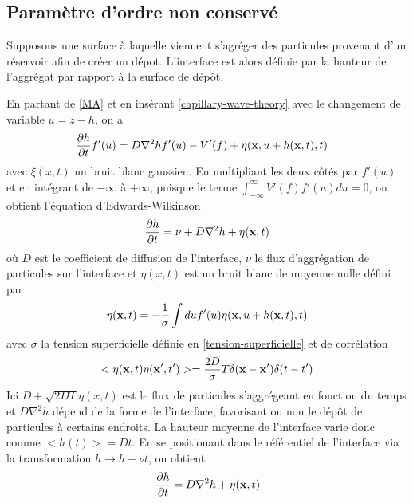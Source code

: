     \subsection{Paramètre d'ordre non conservé}

Supposons une surface à laquelle viennent s'agréger des particules provenant d'un réservoir afin de créer un dépot. L'interface est alors définie par la hauteur de l'aggrégat par rapport à la surface de dépôt.

En partant de \ref{MA} et en insérant \ref{capillary-wave-theory} avec le changement de variable $u= z-h$, on a \cite{bray_interface_2001}
\begin{align}
    \frac{\partial h}{\partial t} f'(u) &= D \nabla^2 h f'(u) - V'(f) + \eta({\bf x},u+h({\bf x},t),t)
\end{align}
avec $\xi(x,t)$ un bruit blanc gaussien. En multipliant les deux côtés par $f'(u)$ et en intégrant de $-\infty$ à $+\infty$, puisque le terme $ \int_{-\infty}^\infty V'(f) f'(u) du = 0$, on obtient l'équation d'Edwards-Wilkinson \cite{edwards_surface_1982} 
\begin{align}
     \frac{\partial h}{\partial t} = \nu + D \nabla^2 h +  \eta({\bf x},t)
    \label{edwards-wilkinson}
\end{align}
où $D$ est le coefficient de diffusion de l'interface, $\nu$ le flux d'aggrégation de particules sur l'interface et $\eta(x,t)$ est un bruit blanc de moyenne nulle défini par
\begin{align}
    \eta({\bf x},t) = - \frac{1}{\sigma} \int du f'(u) \eta({\bf x},u+h({\bf x},t),t)
\end{align}
avec $\sigma$ la tension superficielle définie en \ref{tension-superficielle} et de corrélation 
\begin{align}
    <\eta({\bf x},t)\eta({\bf x}',t')> = \frac{2 D}{\sigma} T\delta({\bf x}-{\bf x}')\delta(t-t')
\end{align}
Ici $D+ \sqrt{2 D T} \eta(x,t)$ est le flux de particules s'aggrégeant en fonction du temps et $D \nabla^2 h$ dépend de la forme de l'interface, favorisant ou non le dépôt de particules à certains endroits.
La hauteur moyenne de l'interface varie donc comme $<h(t)> = Dt$. En se positionant dans le référentiel de l'interface via la transformation $h \rightarrow h + \nu t$, on obtient
\begin{align}
     \frac{\partial h}{\partial t} =   D \nabla^2 h +   \eta({\bf x},t)
    \label{edwards-wilkinson-conesrved}
\end{align}

